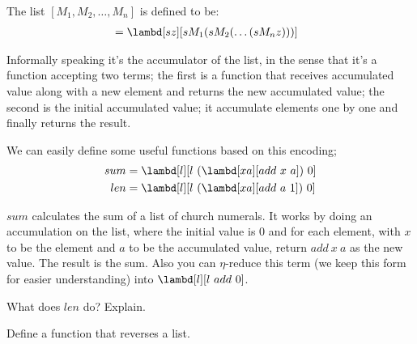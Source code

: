 \documentclass[../../../include/open-logic-section]{subfiles}
\begin{document}

The list $[M_1, M_2, \ldots, M_n]$ is defined to be:
\begin{align*}
  [M_1, M_2, \ldots, M_n] &= \lambd[sz][s M_1 (s M_2 (\ldots (s M_n z)))]
\end{align*}

Informally speaking it's the accumulator of the list, in the sense
that it's a function accepting two terms; the first is a function that receives accumulated value
along with a new element and returns the new accumulated value; the
second is the initial accumulated value; it accumulate elements one by
one and finally returns the result.

We can easily define some useful functions based on this encoding; 
\begin{align*}
  {sum} &= \lambd[l][l ~ (\lambd[xa][add ~ x ~ a])~  0]\\
  len &= \lambd[l][l ~ (\lambd[xa][add ~ a ~ 1]) ~ 0]
\end{align*}

$sum$ calculates the sum of a list of church numerals. It works by
doing an accumulation on the list, where the initial value is $0$ and
for each element, with $x$ to be the element and $a$ to be the
accumulated value, return $add ~ x ~ a$ as the new value. The result
is the sum. Also you can $\eta$-reduce this term (we keep this form for
easier understanding) into $\lambd[l][l ~ add ~ 0]$.

\begin{prob}
  What does $len$ do? Explain.
\end{prob}

\begin{prob}
  Define a function that reverses a list.
\end{prob}
\end{document}
